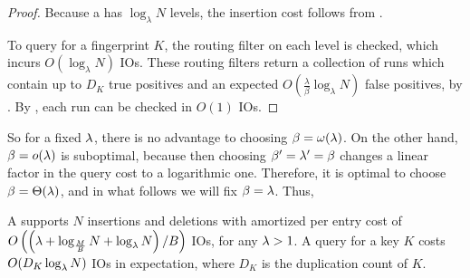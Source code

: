
\begin{proof}
	Because a \boa{} has $\log_\lambda N$ levels, the insertion cost follows from
	.

	To query for a fingerprint $K$, the routing filter on each level is
	checked, which incurs $O(\log_\lambda N)$ IOs. These routing filters return
	a collection of runs which contain up to $D_K$ true positives and an
	expected $O\left(\frac{\lambda}{\beta}\log_\lambda N\right)$ false
	positives, by . By
	, each run can be checked in $O(1)$ IOs.
\end{proof}

So for a fixed $\lambda$, there is no advantage to choosing $\beta =
\omega(\lambda)$. On the other hand, $\beta = o(\lambda)$ is suboptimal, because
then choosing $\beta'=\lambda'=\beta$ changes a linear factor in the query cost
to a logarithmic one. Therefore, it is optimal to choose $\beta =
\Theta(\lambda)$, and in what follows we will fix $\beta = \lambda$. Thus,

\begin{lemma}\label{thm:boa-cost-expectation}
	A \boa{} supports $N$ insertions and deletions with amortized
	per entry cost of $O\left(\left(\lambda + \log_{\frac{M}{B}} N +
	\log_\lambda{N} \right)/B\right)$ IOs, for any $\lambda > 1$. A query for a key
	$K$ costs $O(D_K\log_\lambda{N})$ IOs in expectation, where $D_K$ is the
	duplication count of $K$.
\end{lemma}

